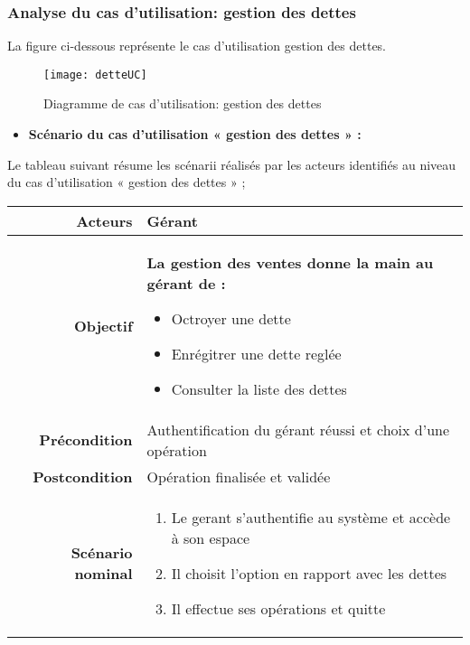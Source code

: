 \documentclass[a4paper,11pt]{article}
\begin{document}
\subsubsection{Analyse du cas d'utilisation: gestion des dettes}
La figure ci-dessous représente le cas d'utilisation gestion des dettes.
\newpage
\begin{figure}[ht]
\texttt{[image: detteUC]}
\caption{Diagramme de cas d'utilisation: gestion des dettes} 
\end{figure}
\begin{itemize}
  \item \textbf{Scénario du cas d’utilisation « gestion des dettes » :} 
\end{itemize}
Le tableau suivant résume les scénarii réalisés par les acteurs identifiés au niveau du cas
d’utilisation « gestion des dettes » ;
\newline
\newline
\begin{tabular}{|r|l|} \hline
\textbf{Acteurs} & Gérant\\ \hline
\textbf{Objectif} & \begin{minipage}{0.95\textwidth}
  \textbf{La gestion des ventes donne la main au gérant de :}
  \begin{itemize}
    \item Octroyer une dette
    \item Enrégitrer une dette reglée
    \item Consulter la liste des dettes
  \end{itemize}
\end{minipage} \\ \hline
\textbf{Précondition} & Authentification du gérant réussi et choix d'une opération \\ \hline
\textbf{Postcondition} & Opération finalisée et validée \\ \hline
\textbf{Scénario nominal} & \begin{minipage}{0.95\textwidth}
  \begin{enumerate}
    \item Le gerant s'authentifie au système et accède à son espace
    \item Il choisit l'option en rapport avec les dettes
    \item Il effectue ses opérations et quitte
\end{enumerate}
\end{minipage} \\ \hline
\end{tabular}
\end{document}
